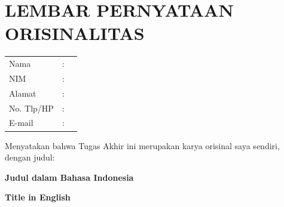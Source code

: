 

\chapter*{\MakeUppercase{Lembar Pernyataan Orisinalitas}}


\begin{tabular}{lcp{}}

     Nama & : &
     \hfill \\ 

     NIM & : &
     \hfill \\

     Alamat & : &
     \hfill \\

     No. Tlp/HP & : &
     \hfill \\

     E-mail & : &
     \hfill \\

\end{tabular}

\vspace{1em}

\noindent
Menyatakan bahwa Tugas Akhir ini merupakan karya orisinal saya sendiri, dengan judul:

\vspace{1em}

\noindent\textbf{Judul dalam Bahasa Indonesia}\\

\vspace{0.5em}

\noindent\textbf{Title in English}\\

